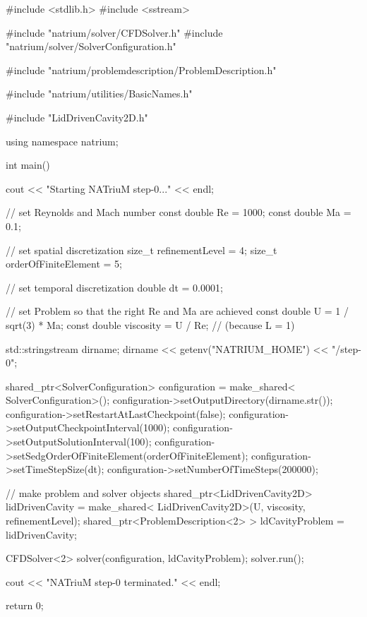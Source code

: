 \begin{DoxyCodeInclude}


#include <stdlib.h>
#include <sstream>

#include "natrium/solver/CFDSolver.h"
#include "natrium/solver/SolverConfiguration.h"

#include "natrium/problemdescription/ProblemDescription.h"

#include "natrium/utilities/BasicNames.h"

#include "LidDrivenCavity2D.h"

using namespace natrium;



int main() {

        cout << "Starting NATriuM step-0..." << endl;

        // set Reynolds and Mach number
        const double Re = 1000;
        const double Ma = 0.1;

        // set spatial discretization
        size_t refinementLevel = 4;
        size_t orderOfFiniteElement = 5;

        // set temporal discretization
        double dt = 0.0001;

        // set Problem so that the right Re and Ma are achieved
        const double U = 1 / sqrt(3) * Ma;
        const double viscosity = U / Re; // (because L = 1)

        std::stringstream dirname;
        dirname << getenv("NATRIUM_HOME") << "/step-0";

        shared_ptr<SolverConfiguration> configuration = make_shared<
                        SolverConfiguration>();
        configuration->setOutputDirectory(dirname.str());
        configuration->setRestartAtLastCheckpoint(false);
        configuration->setOutputCheckpointInterval(1000);
        configuration->setOutputSolutionInterval(100);
        configuration->setSedgOrderOfFiniteElement(orderOfFiniteElement);
        configuration->setTimeStepSize(dt);
        configuration->setNumberOfTimeSteps(200000);

        // make problem and solver objects
        shared_ptr<LidDrivenCavity2D> lidDrivenCavity = make_shared<
                        LidDrivenCavity2D>(U, viscosity, refinementLevel);
        shared_ptr<ProblemDescription<2> > ldCavityProblem = lidDrivenCavity;

        CFDSolver<2> solver(configuration, ldCavityProblem);
        solver.run();

        cout << "NATriuM step-0 terminated." << endl;

        return 0;
}

\end{DoxyCodeInclude}
 